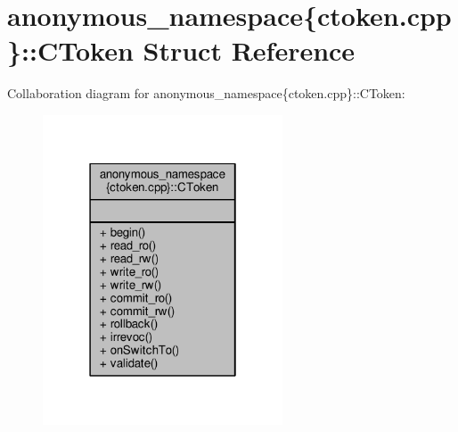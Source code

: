 \hypertarget{structanonymous__namespace_02ctoken_8cpp_03_1_1CToken}{\section{anonymous\-\_\-namespace\{ctoken.\-cpp\}\-:\-:C\-Token Struct Reference}
\label{structanonymous__namespace_02ctoken_8cpp_03_1_1CToken}
}


Collaboration diagram for anonymous\-\_\-namespace\{ctoken.\-cpp\}\-:\-:C\-Token\-:
\nopagebreak
\begin{figure}[H]
\begin{center}
\leavevmode
\includegraphics[width=202pt]{structanonymous__namespace_02ctoken_8cpp_03_1_1CToken__coll__graph}
\end{center}
\end{figure}

